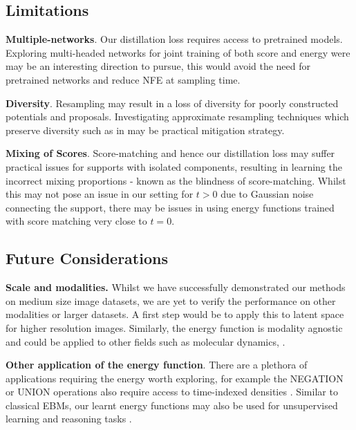 

\subsection{Limitations} 

\textbf{Multiple-networks}. Our distillation loss requires access to pretrained models. Exploring multi-headed networks for joint training of both score and energy were may be an interesting direction to pursue, this would avoid the need for pretrained networks and reduce NFE at sampling time.

\textbf{Diversity}. Resampling may result in a loss of diversity for poorly constructed potentials and proposals. Investigating approximate resampling techniques which preserve diversity such as in \citep{corenflos2021differentiable, ma2020particle,zhu2020towards} may be practical mitigation strategy.

\textbf{Mixing of Scores}. Score-matching and hence our distillation loss may suffer practical issues for supports with isolated components, resulting in learning the incorrect mixing proportions \citep{wenliang2020blindness} - known as the blindness of score-matching. Whilst this may not pose an issue in our setting for $t>0$ due to Gaussian noise connecting the support, there may be issues in using energy functions trained with score matching very close to $t=0$. 

\subsection{Future Considerations} 
\textbf{Scale and modalities.} Whilst we have successfully demonstrated our methods on medium size image datasets, we are yet to verify the performance on other modalities or larger datasets. A first step would be to apply this to latent space \citep{vahdat2021score, rombach2022high} for higher resolution images. Similarly, the energy function is modality agnostic and could be applied to other fields such as molecular dynamics, \citep{arts2023two}.

\textbf{Other application of the energy function}. There are a plethora of applications requiring the energy worth exploring, for example the \textsc{NEGATION} or \textsc{UNION} operations also require access to time-indexed densities \citep{duvisual, koulischer2024dynamic}. Similar to classical EBMs, our learnt energy functions may also be used for unsupervised learning \citep{comet} and reasoning tasks \citep{energy_reasoning}.

